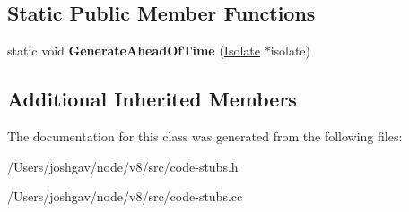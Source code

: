 \subsection*{Static Public Member Functions}
\begin{DoxyCompactItemize}
\item 
static void {\bfseries Generate\+Ahead\+Of\+Time} (\hyperlink{classv8_1_1internal_1_1_isolate}{Isolate} $\ast$isolate)\hypertarget{classv8_1_1internal_1_1_create_weak_cell_stub_a27228d50f552ec673c5015b268317258}{}\label{classv8_1_1internal_1_1_create_weak_cell_stub_a27228d50f552ec673c5015b268317258}

\end{DoxyCompactItemize}
\subsection*{Additional Inherited Members}


The documentation for this class was generated from the following files\+:\begin{DoxyCompactItemize}
\item 
/\+Users/joshgav/node/v8/src/code-\/stubs.\+h\item 
/\+Users/joshgav/node/v8/src/code-\/stubs.\+cc\end{DoxyCompactItemize}
